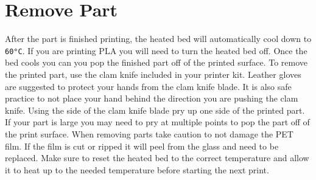 \section{Remove Part}
After the part is finished printing, the heated bed will automatically cool down to \texttt{60°C}. If you are printing PLA you will need to turn the heated bed off. Once the bed cools you can you pop the finished part off of the printed surface. To remove the printed part, use the clam knife included in your printer kit. Leather gloves are suggested to protect your hands from the clam knife blade. It is also safe practice to not place your hand behind the direction you are pushing the clam knife. Using the side of the clam knife blade pry up one side of the printed part. If your part is large you may need to pry at multiple points to pop the part off of the print surface. When removing parts take caution to not damage the PET film. If the film is cut or ripped it will peel from the glass and need to be replaced. Make sure to reset the heated bed to the correct temperature and allow it to heat up to the needed temperature before starting the next print.

